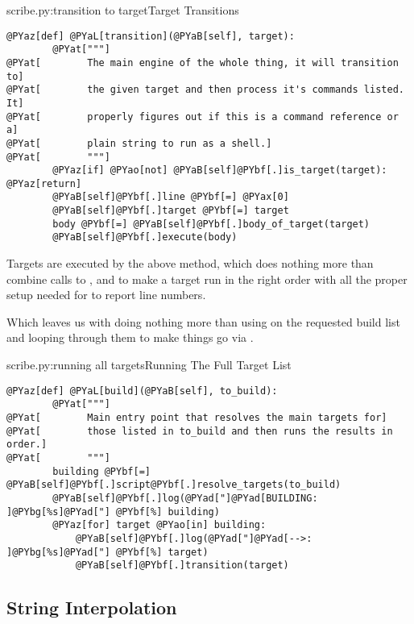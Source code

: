 \begin{code}{scribe.py:transition to target}{Target Transitions}
\begin{Verbatim}[commandchars=@\[\]]
    @PYaz[def] @PYaL[transition](@PYaB[self], target):
        @PYat["""]
@PYat[        The main engine of the whole thing, it will transition to]
@PYat[        the given target and then process it's commands listed.  It]
@PYat[        properly figures out if this is a command reference or a]
@PYat[        plain string to run as a shell.]
@PYat[        """]
        @PYaz[if] @PYao[not] @PYaB[self]@PYbf[.]is_target(target): @PYaz[return]
        @PYaB[self]@PYbf[.]line @PYbf[=] @PYax[0]
        @PYaB[self]@PYbf[.]target @PYbf[=] target
        body @PYbf[=] @PYaB[self]@PYbf[.]body_of_target(target)
        @PYaB[self]@PYbf[.]execute(body)
\end{Verbatim}

\end{code}

Targets are executed by the above  method, which does nothing
more than combine calls to ,  and
 to make a target run in the right order with all the proper
setup needed for  to report line numbers.

Which leaves us with  doing nothing more than using
 on the requested build list and looping through
them to make things go via .

\begin{code}{scribe.py:running all targets}{Running The Full Target List}
\begin{Verbatim}[commandchars=@\[\]]
    @PYaz[def] @PYaL[build](@PYaB[self], to_build):
        @PYat["""]
@PYat[        Main entry point that resolves the main targets for]
@PYat[        those listed in to_build and then runs the results in order.]
@PYat[        """]
        building @PYbf[=] @PYaB[self]@PYbf[.]script@PYbf[.]resolve_targets(to_build)
        @PYaB[self]@PYbf[.]log(@PYad["]@PYad[BUILDING: ]@PYbg[%s]@PYad["] @PYbf[%] building)
        @PYaz[for] target @PYao[in] building:
            @PYaB[self]@PYbf[.]log(@PYad["]@PYad[-->: ]@PYbg[%s]@PYad["] @PYbf[%] target)
            @PYaB[self]@PYbf[.]transition(target)
\end{Verbatim}

\end{code}

\subsection{String Interpolation}

